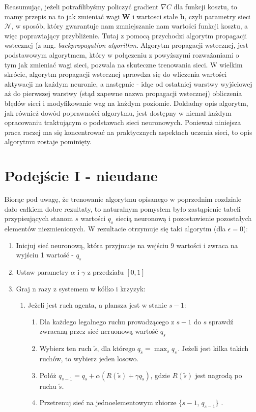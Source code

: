 \documentclass[licencjacka]{pracamgr}
\begin{document}
Reasumując, jeżeli potrafilibyśmy policzyć gradient $\nabla C$ dla funkcji kosztu, to mamy przepis na to jak zmieniać wagi $\mathbf{W}$ i wartosci stałe $\mathbf{b}$, czyli parametry sieci $\mathcal{N}$, w sposób, który gwarantuje nam zmniejszanie nam wartości funkcji kosztu, a więc poprawiający przybliżenie. Tutaj z pomocą przychodzi algorytm propagacji wstecznej (z ang. \textit{backpropagation algorithm}. Algorytm propagacji wstecznej, jest podstawowym algorytmem, który w połączeniu z powyższymi rozważaniami o tym jak zmieniać wagi sieci, pozwala na skuteczne trenowania sieci. W wielkim skrócie, algorytm propagacji wstecznej sprawdza się do wliczenia wartości aktywacji na każdym neuronie, a następnie - idąc od ostatniej warstwy wyjściowej aż do pierwszej warstwy (stąd zapewne nazwa propagacji wstecznej) obliczenia błędów sieci i modyfikowanie wag na każdym poziomie. Dokładny opis algorytm, jak również dowód poprawności algorytmu, jest dostępny w niemal każdym opracowaniu traktującym o podstawach sieci neuronowych. Ponieważ niniejsza praca raczej ma się koncentrować na praktycznych aspektach uczenia sieci, to opis algorytmu zostaje pominięty.

\section{Podejście I - nieudane}

Biorąc pod uwagę, że trenowanie algorytmu opisanego w poprzednim rozdziale dało całkiem dobre rezultaty, to naturalnym pomysłem było zastąpienie tabeli przypisujących stanom $s$ wartości $q_{s}$ siecią neuronową i pozostawienie pozostałych elementów niezmienionych. W rezultacie otrzymuje się taki algorytm (dla $\epsilon=0$):

\begin{enumerate}
	\item{Inicjuj sieć neuronową, która przyjmuje na wejściu 9 wartości i zwraca na wyjściu 1 wartość -  $q_{s}$}
	\item{Ustaw parametry $\alpha$ i $\gamma$ z przedziału $[0, 1]$}
	\item{Graj n razy z systemem w kółko i krzyzyk:}
	\begin{enumerate}
		\item{Jeżeli jest ruch agenta, a plansza jest w stanie $s-1$:}
		\begin{enumerate}
			\item{Dla każdego legalnego ruchu prowadzącego z $s-1$ do $s$  sprawdź zwracaną przez sieć neruonową wartość $q_{s}$}
			\item{Wybierz ten ruch $\tilde{s}$, dla którego $q_{\tilde{s}} =\max_{s} q_{s}$. Jeżeli jest kilka takich ruchów, to wybierz jeden losowo.}
			\item{Połóż $q_{s-1} = q_{s} + \alpha(R(\tilde{s}) + \gamma  q_{\tilde{s}} )$, gdzie $R(\tilde{s})$ jest nagrodą po ruchu $\tilde{s}$. }
			\item{Przetrenuj sieć na jednoelementowym zbiorze \{$s-1$, $q_{s-1}$\} }.
		\end{enumerate}
	\end{enumerate}
\end{enumerate}
\end{document}

